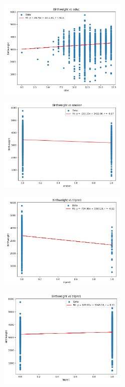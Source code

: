 \documentclass{uofa-eng-assignment}
\begin{document}
\begin{enumerate}
{\begin{figure}[H]
            \end{figure}
            \begin{figure}[H]
                \centering
                \includegraphics[width=0.55\textwidth]{bw-edc.png}
            \end{figure}
            \begin{figure}[H]
                \centering
                \includegraphics[width=0.55\textwidth]{bw-smo.png}
            \end{figure}
            \begin{figure}[H]
                \centering
                \includegraphics[width=0.55\textwidth]{bw-trip0.png}
            \end{figure}
            \begin{figure}[H]
                \centering
                \includegraphics[width=0.55\textwidth]{bw-trip1.png}

\end{figure}}
\end{enumerate}
\end{document}
